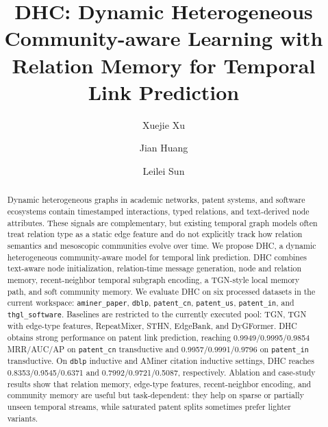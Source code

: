 \documentclass[runningheads]{llncs}
\begin{document}
\title{DHC: Dynamic Heterogeneous Community-aware Learning with Relation Memory for Temporal Link Prediction}

\author{Xuejie Xu \and Jian Huang \and Leilei Sun}



\maketitle

\begin{abstract}
Dynamic heterogeneous graphs in academic networks, patent systems, and software ecosystems contain timestamped interactions, typed relations, and text-derived node attributes. These signals are complementary, but existing temporal graph models often treat relation type as a static edge feature and do not explicitly track how relation semantics and mesoscopic communities evolve over time. We propose DHC, a dynamic heterogeneous community-aware model for temporal link prediction. DHC combines text-aware node initialization, relation-time message generation, node and relation memory, recent-neighbor temporal subgraph encoding, a TGN-style local memory path, and soft community memory. We evaluate DHC on six processed datasets in the current workspace: \texttt{aminer\_paper}, \texttt{dblp}, \texttt{patent\_cn}, \texttt{patent\_us}, \texttt{patent\_in}, and \texttt{thgl\_software}. Baselines are restricted to the currently executed pool: TGN, TGN with edge-type features, RepeatMixer, STHN, EdgeBank, and DyGFormer. DHC obtains strong performance on patent link prediction, reaching 0.9949/0.9995/0.9854 MRR/AUC/AP on \texttt{patent\_cn} transductive and 0.9957/0.9991/0.9796 on \texttt{patent\_in} transductive. On \texttt{dblp} inductive and AMiner citation inductive settings, DHC reaches 0.8353/0.9545/0.6371 and 0.7992/0.9721/0.5087, respectively. Ablation and case-study results show that relation memory, edge-type features, recent-neighbor encoding, and community memory are useful but task-dependent: they help on sparse or partially unseen temporal streams, while saturated patent splits sometimes prefer lighter variants.

\end{abstract}
\end{document}
